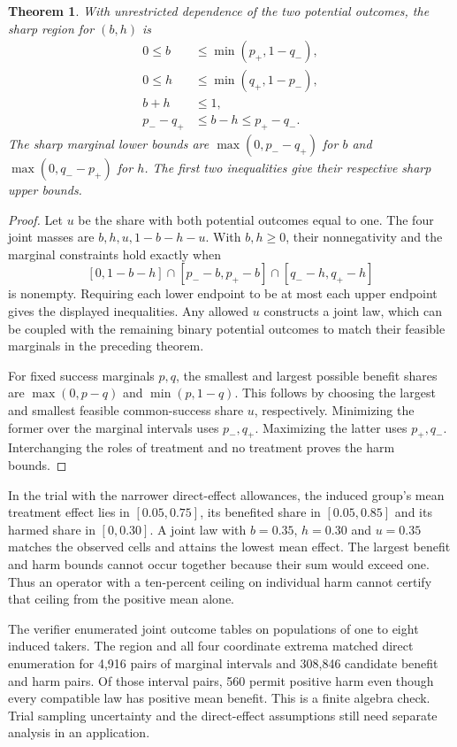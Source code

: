 \documentclass[11pt]{article}
\newtheorem{theorem}{Theorem}
\begin{document}
\begin{theorem}
With unrestricted dependence of the two potential outcomes, the
sharp region for $(b,h)$ is
\begin{align*}
 0\le b &\le \min(p_+,1-q_-),\\
 0\le h &\le \min(q_+,1-p_-),\\
 b+h &\le 1,\\
 p_--q_+ &\le b-h\le p_+-q_- .
\end{align*}
The sharp marginal lower bounds are $\max(0,p_--q_+)$ for $b$
and $\max(0,q_--p_+)$ for $h$. The first two inequalities give
their respective sharp upper bounds.
\end{theorem}
\begin{proof}
Let $u$ be the share with both potential outcomes equal to one.
The four joint masses are $b,h,u,1-b-h-u$. With $b,h\ge0$,
their nonnegativity and the marginal constraints hold exactly when
\[
 [0,1-b-h]\cap[p_--b,p_+-b]\cap[q_--h,q_+-h]
\]
is nonempty. Requiring each lower endpoint to be at most each
upper endpoint gives the displayed inequalities. Any allowed
$u$ constructs a joint law, which can be coupled with the
remaining binary potential outcomes to match their feasible
marginals in the preceding theorem.

For fixed success marginals $p,q$, the smallest and largest
possible benefit shares are $\max(0,p-q)$ and $\min(p,1-q)$.
This follows by choosing the largest and smallest feasible
common-success share $u$, respectively. Minimizing the former
over the marginal intervals uses $p_-,q_+$. Maximizing the
latter uses $p_+,q_-$. Interchanging the roles of treatment
and no treatment proves the harm bounds.
\end{proof}

In the trial with the narrower direct-effect allowances, the
induced group's mean treatment effect lies in $[0.05,0.75]$,
its benefited share in $[0.05,0.85]$ and its harmed share in
$[0,0.30]$. A joint law with $b=0.35$, $h=0.30$ and $u=0.35$
matches the observed cells and attains the lowest mean effect.
The largest benefit and harm bounds cannot occur together
because their sum would exceed one. Thus an operator with a
ten-percent ceiling on individual harm cannot certify that
ceiling from the positive mean alone.

The verifier enumerated joint outcome tables on populations of
one to eight induced takers. The region and all four coordinate
extrema matched direct enumeration for 4,916 pairs of marginal
intervals and 308,846 candidate benefit and harm pairs. Of
those interval pairs, 560 permit positive harm even though
every compatible law has positive mean benefit. This is a finite
algebra check. Trial sampling uncertainty and the direct-effect
assumptions still need separate analysis in an application.
\end{document}
